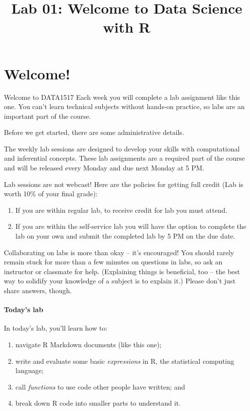 \documentclass[
]{article}
\title{Lab 01: Welcome to Data Science with R}
\author{}
\date{\vspace{-2.5em}}
\providecommand{\tightlist}{%
  \setlength{\itemsep}{0pt}\setlength{\parskip}{0pt}}
\begin{document}
\maketitle

\section{Welcome!}\label{welcome}

Welcome to DATA1517 Each week you will complete a lab assignment like
this one. You can't learn technical subjects without hands-on practice,
so labs are an important part of the course.

Before we get started, there are some administrative details.

The weekly lab sessions are designed to develop your skills with
computational and inferential concepts. These lab assignments are a
required part of the course and will be released every Monday and due
next Monday at 5 PM.

Lab sessions are not webcast! Here are the policies for getting full
credit (Lab is worth 10\% of your final grade):

\begin{enumerate}
\def\labelenumi{\arabic{enumi}.}
\item
  If you are within regular lab, to receive credit for lab you must
  attend.
\item
  If you are within the self-service lab you will have the option to
  complete the lab on your own and submit the completed lab by 5 PM on
  the due date.
\end{enumerate}

Collaborating on labs is more than okay -- it's encouraged! You should
rarely remain stuck for more than a few minutes on questions in labs, so
ask an instructor or classmate for help. (Explaining things is
beneficial, too -- the best way to solidify your knowledge of a subject
is to explain it.) Please don't just share answers, though.

\paragraph{Today's lab}\label{todays-lab}

In today's lab, you'll learn how to:

\begin{enumerate}
\def\labelenumi{\arabic{enumi}.}
\tightlist
\item
  navigate R Markdown documents (like this one);
\item
  write and evaluate some basic \emph{expressions} in R, the statistical
  computing language;
\item
  call \emph{functions} to use code other people have written; and
\item
  break down R code into smaller parts to understand it.
\end{enumerate}
\end{document}
